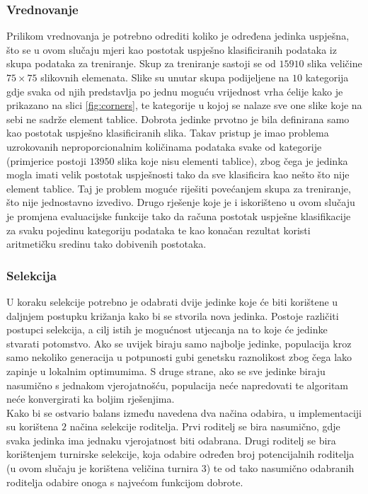 \documentclass[times, utf8, zavrsni, numeric]{fer}
\begin{document}
\subsubsection{Vrednovanje}
Prilikom vrednovanja je potrebno odrediti koliko je određena jedinka uspješna, što se u ovom slučaju mjeri kao postotak uspješno klasificiranih podataka iz skupa podataka za treniranje.
Skup za treniranje sastoji se od $15910$ slika veličine $75\times 75$ slikovnih elemenata.
Slike su unutar skupa podijeljene na $10$ kategorija gdje svaka od njih predstavlja po jednu moguću vrijednost vrha ćelije kako je prikazano na slici \ref{fig:corners}, te kategorije u kojoj se nalaze sve one slike koje na sebi ne sadrže element tablice.
Dobrota jedinke prvotno je bila definirana samo kao postotak uspješno klasificiranih slika.
Takav pristup je imao problema uzrokovanih neproporcionalnim količinama podataka svake od kategorije (primjerice postoji $13950$ slika koje nisu elementi tablice), zbog čega je jedinka mogla imati velik postotak uspješnosti tako da sve klasificira kao nešto što nije element tablice.
Taj je problem moguće riješiti povećanjem skupa za treniranje, što nije jednostavno izvedivo.
Drugo rješenje koje je i iskorišteno u ovom slučaju je promjena evaluacijske funkcije tako da računa postotak uspješne klasifikacije za svaku pojedinu kategoriju podataka te kao konačan rezultat koristi aritmetičku sredinu tako dobivenih postotaka.
 
\subsubsection{Selekcija}
U koraku selekcije potrebno je odabrati dvije jedinke koje će biti korištene u daljnjem postupku križanja kako bi se stvorila nova jedinka.
Postoje različiti postupci selekcija, a cilj istih je mogućnost utjecanja na to koje će jedinke stvarati potomstvo. 
Ako se uvijek biraju samo najbolje jedinke, populacija kroz samo nekoliko generacija u potpunosti gubi genetsku raznolikost zbog čega lako zapinje u lokalnim optimumima.
S druge strane, ako se sve jedinke biraju nasumično s jednakom vjerojatnošću, populacija neće napredovati te algoritam neće konvergirati ka boljim rješenjima.\\

Kako bi se ostvario balans između navedena dva načina odabira, u implementaciji su korištena $2$ načina selekcije roditelja.
Prvi roditelj se bira nasumično, gdje svaka jedinka ima jednaku vjerojatnost biti odabrana.
Drugi roditelj se bira korištenjem turnirske selekcije, koja odabire određen broj potencijalnih roditelja (u ovom slučaju je korištena veličina turnira $3$) te od tako nasumično odabranih roditelja odabire onoga s najvećom funkcijom dobrote.
\end{document}

